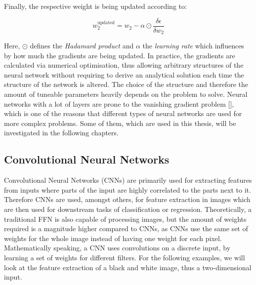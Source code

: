 \documentclass[11pt]{scrartcl}
\begin{document}
Finally, the respective weight is being updated according to:

\begin{equation}
    w_2^{\text{updated}} = w_2 - \alpha \odot \frac{\delta \epsilon}{\delta w_2}
\end{equation}

Here, $\odot$ defines the \textit{Hadamard product} and $\alpha$ the \textit{learning rate} which influences by how much the gradients are being updated. In practice, the gradients are calculated via numerical optimisation, thus allowing arbitrary structures of the neural network without requiring to derive an analytical solution each time the structure of the network is altered. The choice of the structure and therefore the amount of tuneable parameters heavily depends on the problem to solve. Neural networks with a lot of layers are prone to the vanishing gradient problem [\cite{pascanu2012difficulty}], which is one of the reasons that different types of neural networks are used for more complex problems. Some of them, which are used in this thesis, will be investigated in the following chapters.

\FloatBarrier
\subsection{Convolutional Neural Networks}

Convolutional Neural Networks (CNNs) are primarily used for extracting features from inputs where parts of the input are highly correlated to the parts next to it. Therefore CNNs are used, amongst others, for feature extraction in images which are then used for downstream tasks of classification or regression. Theoretically, a traditional FFN is also capable of processing images, but the amount of weights required is a magnitude higher compared to CNNs, as CNNs use the same set of weights for the whole image instead of having one weight for each pixel. Mathematically speaking, a CNN uses convolutions on a discrete input, by learning a set of weights for different filters. For the following examples, we will look at the feature extraction of a black and white image, thus a two-dimensional input.
\end{document}
